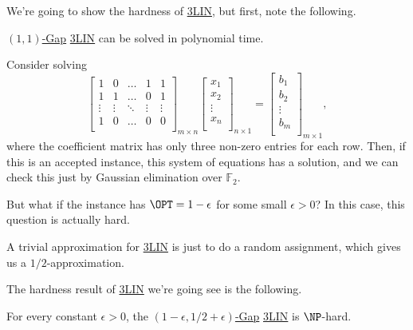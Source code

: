 We're going to show the hardness of \hyperref[prb:max-3LIN]{3LIN}, but first, note the following.
\begin{claim}
	\hyperref[def:c-s-Gap]{\((1, 1)\)-Gap} \hyperref[prb:max-3LIN]{3LIN} can be solved in polynomial time.
\end{claim}
\begin{explanation}
	Consider solving
	\[
		\begin{bmatrix}
			1      & 0      & \dots  & 1      & 1      \\
			1      & 1      & \dots  & 0      & 1      \\
			\vdots & \vdots & \ddots & \vdots & \vdots \\
			1      & 0      & \dots  & 0      & 0      \\
		\end{bmatrix}_{m\times n} \begin{bmatrix}
			x_1    \\
			x_2    \\
			\vdots \\
			x_n    \\
		\end{bmatrix}_{n\times 1} = \begin{bmatrix}
			b_1    \\
			b_2    \\
			\vdots \\
			b_m    \\
		\end{bmatrix}_{m\times 1},
	\]
	where the coefficient matrix has only three non-zero entries for each row. Then, if this is an accepted instance, this system of equations has a solution, and we can check this just by Gaussian elimination over \(\mathbb{F} _2\).
\end{explanation}

But what if the instance has \(\OPT = 1 - \epsilon \) for some small \(\epsilon > 0\)? In this case, this question is actually hard.

\begin{remark}
	A trivial approximation for \hyperref[prb:max-3LIN]{3LIN} is just to do a random assignment, which gives us a \(1 / 2\)-approximation.
\end{remark}

The hardness result of \hyperref[prb:max-3LIN]{3LIN} we're going see is the following.

\begin{theorem}[\cite{10.1145/258533.258536}]\label{thm:3LIN}
	For every constant \(\epsilon >0\), the \hyperref[def:c-s-Gap]{\((1 - \epsilon , 1 / 2 + \epsilon )\)-Gap} \hyperref[prb:max-3LIN]{3LIN} is \(\NP\)-hard.
\end{theorem}


